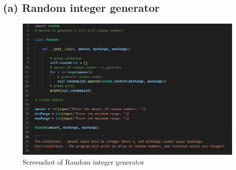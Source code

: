 \documentclass{article}
\begin{document}
\subsection{(a) Random integer generator}
\begin{figure}[ht]
	\centering
	\includegraphics[width=\textwidth]{6_a_random_int_gen.png}
	\caption{Screenshot of Random integer generator}
	\label{fig:random_int_gen}
\end{figure}
\newpage
\end{document}
